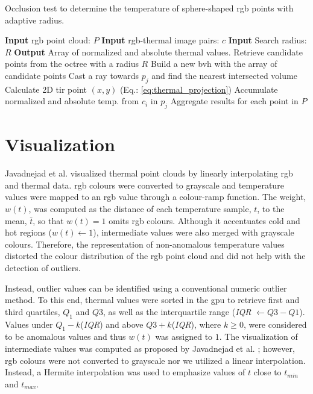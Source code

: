 \begin{algorithm}[hbt]
    \small
	\caption{Occlusion test to determine the temperature of sphere-shaped \acrshort{rgb} points with adaptive radius.}
	\label{alg:occlusion_test}
	\begin{algorithmic}[1]
    	\State \textbf{Input} \acrshort{rgb} point cloud: $P$ %
    	\State \textbf{Input} \acrshort{rgb}-thermal image pairs: $c$ %
    	\State \textbf{Input} Search radius: $R$ %
        \State \textbf{Output} Array of normalized and absolute thermal values. %
		    \State Retrieve candidate points from the octree with a radius $R$  %
		    \State Build a new \acrshort{bvh} with the array of candidate points %
		        \State Cast a ray towards $p_j$ and find the nearest intersected volume %
		            \State Calculate 2D \acrshort{tir} point $(x, y)$ (Eq.: \ref{eq:thermal_projection}) %
		                \State Accumulate normalized and absolute temp. from $c_i$ in $p_j$ %
	    	        \EndIf
	    	    \EndIf
		    \EndFor
		\EndFor
		\State Aggregate results for each point in $P$%
	\end{algorithmic}
    \normalsize
\end{algorithm} 

\section{Visualization}

Javadnejad et al. \cite{javadnejad_photogrammetric_2020} visualized thermal point clouds by linearly interpolating \acrshort{rgb} and thermal data. \acrshort{rgb} colours were converted to grayscale and temperature values were mapped to an \acrshort{rgb} value through a colour-ramp function. The weight, $w(t)$, was computed as the distance of each temperature sample, $t$, to the mean, $\bar{t}$, so that $w(t) = 1$ omits \acrshort{rgb} colours. Although it accentuates cold and hot regions ($w(t) \gets 1$), intermediate values were also merged with grayscale colours. Therefore, the representation of non-anomalous temperature values distorted the colour distribution of the \acrshort{rgb} point cloud and did not help with the detection of outliers.

Instead, outlier values can be identified using a conventional numeric outlier method. To this end, thermal values were sorted in the \acrshort{gpu} to retrieve first and third quartiles, $Q_1$ and $Q3$, as well as the interquartile range (\textit{IQR} $\gets Q3 - Q1$). Values under $Q_1 - k$(\textit{IQR}) and above $Q3 + k$(\textit{IQR}), where $k \geq 0$, were considered to be anomalous values and thus $w(t)$ was assigned to $1$. The visualization of intermediate values was computed as proposed by Javadnejad et al. \cite{javadnejad_photogrammetric_2020}; however, \acrshort{rgb} colours were not converted to grayscale nor we utilized a linear interpolation. Instead, a Hermite interpolation was used to emphasize values of $t$ close to $t_{\textit{min}}$ and $t_{\textit{max}}$. 

